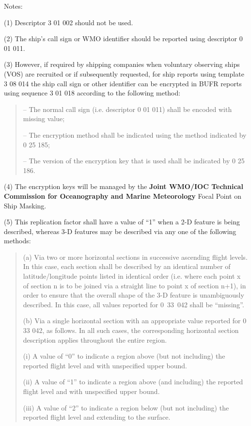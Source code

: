 Notes:

(1) Descriptor 3 01 002 should not be used.

(2) The ship's call sign or WMO identifier should be reported using descriptor 0 01 011.

(3) However, if required by shipping companies when voluntary observing ships (VOS) are recruited or if subsequently requested, for ship reports using template 3 08 014 the ship call sign or other identifier can be encrypted in BUFR reports using sequence 3 01 018 according to the following method:

\begin{quote}
-- The normal call sign (i.e. descriptor 0 01 011) shall be encoded with missing value;

-- The encryption method shall be indicated using the method indicated by 0 25 185;

-- The version of the encryption key that is used shall be indicated by 0 25 186.
\end{quote}

(4) The encryption keys will be managed by the \textbf{Joint WMO/IOC Technical Commission for Oceanography and Marine Meteorology} Focal Point on Ship Masking.

(5) This replication factor shall have a value of ``1'' when a 2-D feature is being described, whereas 3-D features may be described via any one of the following methods:

\begin{quote}
(a) Via two or more horizontal sections in successive ascending flight levels. In this case, each section shall be described by an identical number of latitude/longitude points listed in identical order (i.e. where each point x of section n is to be joined via a straight line to point x of section n+1), in order to ensure that the overall shape of the 3-D feature is unambiguously described. In this case, all values reported for 0~33~042 shall be ``missing''.

(b) Via a single horizontal section with an appropriate value reported for 0 33 042, as follows. In all such cases, the corresponding horizontal section description applies throughout the entire region.

(i) A value of ``0'' to indicate a region above (but not including) the reported flight level and with unspecified upper bound.

(ii) A value of ``1'' to indicate a region above (and including) the reported flight level and with unspecified upper bound.

(iii) A value of ``2'' to indicate a region below (but not including) the reported flight level and extending to the surface.
\end{quote}

